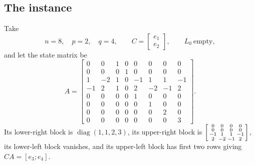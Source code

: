 \subsection{The instance}\label{sec6:sub:instance}

Take
\begin{equation}\label{sec6:eq:data}
n=8,\quad p=2,\quad q=4,\qquad
C=\begin{bmatrix}e_1\\ e_2\end{bmatrix},\qquad L_0\ \text{empty},
\end{equation}
and let the state matrix be
\begin{equation}\label{sec6:eq:A}
A=\begin{bmatrix}
0&0&1&0&0&0&0&0\\
0&0&0&1&0&0&0&0\\
1&-2&1&0&-1&1&1&-1\\
-1&2&1&0&2&-2&-1&2\\
0&0&0&0&1&0&0&0\\
0&0&0&0&0&1&0&0\\
0&0&0&0&0&0&2&0\\
0&0&0&0&0&0&0&3
\end{bmatrix}.
\end{equation}
Its lower-right block is $\operatorname{diag}(1,1,2,3)$, its upper-right block is
$\begin{bsmallmatrix}0&0&0&0\\0&0&0&0\\-1&1&1&-1\\2&-2&-1&2\end{bsmallmatrix}$, its lower-left block
vanishes, and its upper-left block has first two rows giving $CA=[e_3;e_4]$.

